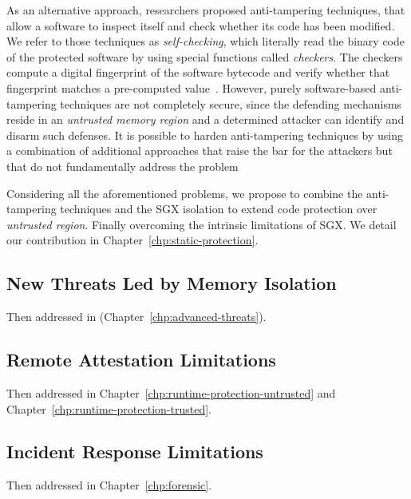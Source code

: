 As an alternative approach, researchers proposed anti-tampering techniques, 
that allow a software to inspect itself and check whether its code has been 
modified.
We refer to those techniques as \emph{self-checking}, which literally read the 
binary code of the protected software by using special functions called 
\emph{checkers}.
The checkers compute a digital fingerprint of the software bytecode and verify 
whether that fingerprint matches a pre-computed 
value~\citep{nagra2009surreptitious}. 
However, purely software-based anti-tampering techniques are not 
completely secure, since the defending mechanisms reside in an 
\emph{untrusted memory region} and a determined attacker can identify and 
disarm such defenses.
It is possible to harden anti-tampering techniques by using a combination of 
additional 
approaches that raise the bar for the attackers but that do not fundamentally 
address the 
problem~~\citep{horne2001dynamic,banescu2017tutorial,chen2016advanced,chang2001protecting,viticchie2016reactive}

Considering all the aforementioned problems, we propose to combine the 
anti-tampering techniques and the SGX isolation to extend code protection over 
\emph{untrusted region}.
Finally overcoming the intrinsic limitations of SGX.
We detail our contribution in Chapter~\ref{chp:static-protection}.

\subsection{New Threats Led by Memory Isolation}
\label{ssec:contribution2}

Then addressed in (Chapter~\ref{chp:advanced-threats}).

\subsection{Remote Attestation Limitations}
\label{ssec:contribution3}

Then addressed in Chapter~\ref{chp:runtime-protection-untrusted} and
Chapter~\ref{chp:runtime-protection-trusted}.

\subsection{Incident Response Limitations}
\label{ssec:contribution4}

Then addressed in Chapter~\ref{chp:forensic}.

